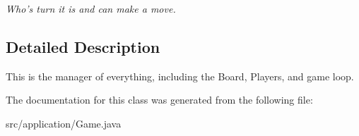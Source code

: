 \begin{DoxyCompactItemize}
\begin{DoxyCompactList}\small\item\em Who's turn it is and can make a move. \end{DoxyCompactList}\end{DoxyCompactItemize}


\subsection{Detailed Description}
This is the manager of everything, including the Board, Players, and game loop. 

The documentation for this class was generated from the following file\+:\begin{DoxyCompactItemize}
\item 
src/application/Game.\+java\end{DoxyCompactItemize}
